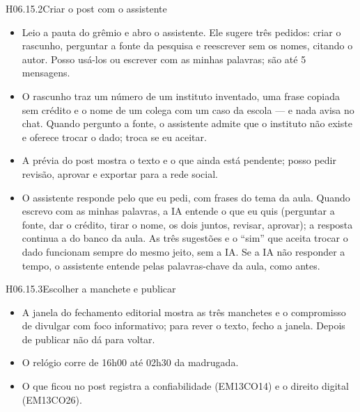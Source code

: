 \begin{historia}{H06.15.2}{Criar o post com o assistente}{\pronto}
\aceite
\begin{itemize}
  \item Leio a pauta do grêmio e abro o assistente. Ele sugere três pedidos:
    criar o rascunho, perguntar a fonte da pesquisa e reescrever sem os nomes,
    citando o autor. Posso usá-los ou escrever com as minhas palavras; são até
    5 mensagens.
  \item O rascunho traz um número de um instituto inventado, uma frase copiada
    sem crédito e o nome de um colega com um caso da escola --- e nada avisa
    no chat. Quando pergunto a fonte, o assistente admite que o instituto não
    existe e oferece trocar o dado; troca se eu aceitar.
  \item A prévia do post mostra o texto e o que ainda está pendente; posso
    pedir revisão, aprovar e exportar para a rede social.
  \item O assistente responde pelo que eu pedi, com frases do tema da aula.
    Quando escrevo com as minhas palavras, a IA entende o que eu quis
    (perguntar a fonte, dar o crédito, tirar o nome, os dois juntos, revisar,
    aprovar); a resposta continua a do banco da aula. As três sugestões e o
    \enquote{sim} que aceita trocar o dado funcionam sempre do mesmo jeito,
    sem a IA. Se a IA não responder a tempo, o assistente entende pelas
    palavras-chave da aula, como antes.
\end{itemize}
\end{historia}

\begin{historia}{H06.15.3}{Escolher a manchete e publicar}{\pronto}
\aceite
\begin{itemize}
  \item A janela do fechamento editorial mostra as três manchetes e o
    compromisso de divulgar com foco informativo; para rever o texto, fecho a
    janela. Depois de publicar não dá para voltar.
  \item O relógio corre de 16h00 até 02h30 da madrugada.
  \item O que ficou no post registra a confiabilidade (EM13CO14) e o direito
    digital (EM13CO26).
\end{itemize}
\end{historia}

